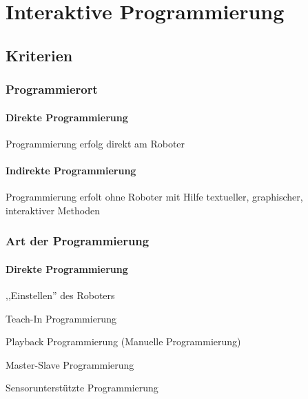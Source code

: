 \chapter{Interaktive Programmierung}

\section{Kriterien}

\subsection{Programmierort}
\subsubsection{Direkte Programmierung}
Programmierung erfolg direkt am Roboter
\subsubsection{Indirekte Programmierung}
Programmierung erfolt ohne Roboter mit Hilfe textueller, graphischer, interaktiver Methoden
\subsection{Art der Programmierung}
\subsubsection{Direkte Programmierung}
\begin{compactitem}
    \item ,,Einstellen'' des Roboters
    \item Teach-In Programmierung
    \item Playback Programmierung (Manuelle Programmierung)
    \item Master-Slave Programmierung
    \item Sensorunterstützte Programmierung
\end{compactitem}
